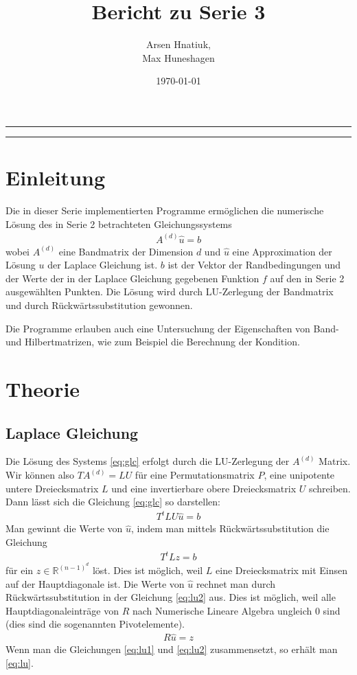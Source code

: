 \documentclass[smallheadings]{scrartcl}
\title{Bericht zu Serie 3}
\author{%
  Arsen Hnatiuk,\\%
  Max Huneshagen 
}
\date{\today}
\numberwithin{equation}{section}
\begin{document}
\maketitle
\tableofcontents
\bigskip

\hrule
\hrule


\section{Einleitung}

Die in dieser Serie implementierten Programme ermöglichen die numerische Lösung des in Serie 2 betrachteten Gleichungssystems
\begin{align}
A^{(d)}\hat{u} = b
\label{eq:glc}
\end{align}
wobei $A^{(d)}$ eine Bandmatrix der Dimension $d$ und $\hat{u}$ eine Approximation der Lösung $u$ der Laplace Gleichung ist. $b$ ist der Vektor der Randbedingungen und der Werte der in der Laplace Gleichung gegebenen Funktion $f$ auf den in Serie 2 ausgewählten Punkten. Die Lösung wird durch LU-Zerlegung der Bandmatrix und durch Rückwärtssubstitution gewonnen.

Die Programme erlauben auch eine Untersuchung der Eigenschaften von Band- und Hilbertmatrizen, wie zum Beispiel die Berechnung der Kondition.

\section{Theorie}

\subsection{Laplace Gleichung}
Die Lösung des Systems \ref{eq:glc} erfolgt durch die LU-Zerlegung der $A^{(d)}$ Matrix. Wir können also $TA^{(d)}=LU$ für eine Permutationsmatrix $P$, eine unipotente untere Dreiecksmatrix $L$ und eine invertierbare obere Dreiecksmatrix $U$ schreiben. Dann lässt sich die Gleichung \ref{eq:glc} so darstellen:
\begin{align}
	T^tLU\hat{u}=b
	\label{eq:lu}
\end{align}
Man gewinnt die Werte von $\hat{u}$, indem man mittels Rückwärtssubstitution die Gleichung 
\begin{align}
	T^tLz=b
	\label{eq:lu1}
\end{align}
für ein $z\in \mathbb{R}^{(n-1)^d}$ löst. Dies ist möglich, weil $L$ eine Dreiecksmatrix mit Einsen auf der Hauptdiagonale ist. Die Werte von $\hat{u}$ rechnet man durch Rückwärtssubstitution in der Gleichung \eqref{eq:lu2} aus. Dies ist möglich, weil alle Hauptdiagonaleinträge von $R$ nach Numerische Lineare Algebra ungleich $0$ sind (dies sind die sogenannten Pivotelemente).
\begin{align}
	R\hat{u}=z
	\label{eq:lu2}
\end{align}
Wenn man die Gleichungen \eqref{eq:lu1} und \eqref{eq:lu2} zusammensetzt, so erhält man \eqref{eq:lu}.
\end{document}
